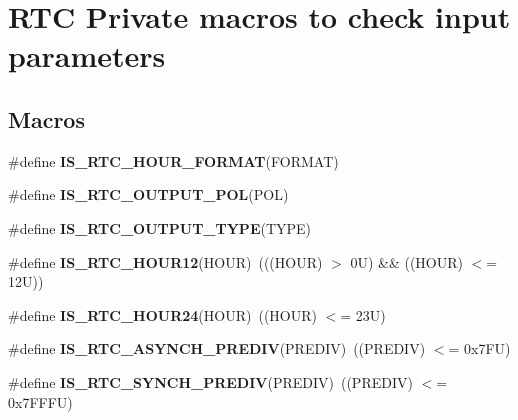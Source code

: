 \hypertarget{group___r_t_c___i_s___r_t_c___definitions}{}\section{R\+TC Private macros to check input parameters}
\label{group___r_t_c___i_s___r_t_c___definitions}
\subsection*{Macros}
\begin{DoxyCompactItemize}
\item 
\#define {\bfseries I\+S\+\_\+\+R\+T\+C\+\_\+\+H\+O\+U\+R\+\_\+\+F\+O\+R\+M\+AT}(F\+O\+R\+M\+AT)
\item 
\#define {\bfseries I\+S\+\_\+\+R\+T\+C\+\_\+\+O\+U\+T\+P\+U\+T\+\_\+\+P\+OL}(P\+OL)
\item 
\#define {\bfseries I\+S\+\_\+\+R\+T\+C\+\_\+\+O\+U\+T\+P\+U\+T\+\_\+\+T\+Y\+PE}(T\+Y\+PE)
\item 
\mbox{\label{group___r_t_c___i_s___r_t_c___definitions_ga6bdfe3bed0a57dfafc2d1de785d48a62}} 
\#define {\bfseries I\+S\+\_\+\+R\+T\+C\+\_\+\+H\+O\+U\+R12}(H\+O\+UR)~(((H\+O\+UR) $>$ 0\+U) \&\& ((\+H\+O\+U\+R) $<$= 12\+U))
\item 
\mbox{\label{group___r_t_c___i_s___r_t_c___definitions_ga4883613bec76074ac62608b89e3f48a8}} 
\#define {\bfseries I\+S\+\_\+\+R\+T\+C\+\_\+\+H\+O\+U\+R24}(H\+O\+UR)~((H\+O\+UR) $<$= 23\+U)
\item 
\mbox{\label{group___r_t_c___i_s___r_t_c___definitions_gac20f6c94ede2d474df8ba4acb7328d93}} 
\#define {\bfseries I\+S\+\_\+\+R\+T\+C\+\_\+\+A\+S\+Y\+N\+C\+H\+\_\+\+P\+R\+E\+D\+IV}(P\+R\+E\+D\+IV)~((P\+R\+E\+D\+IV) $<$= 0x7\+F\+U)
\item 
\mbox{\label{group___r_t_c___i_s___r_t_c___definitions_ga32fccaa6ec65f9fceb3e6e4f31ab11cf}} 
\#define {\bfseries I\+S\+\_\+\+R\+T\+C\+\_\+\+S\+Y\+N\+C\+H\+\_\+\+P\+R\+E\+D\+IV}(P\+R\+E\+D\+IV)~((P\+R\+E\+D\+IV) $<$= 0x7\+F\+F\+F\+U)
\item 
\mbox{\label{group___r_t_c___i_s___r_t_c___definitions_ga8475ceaf2d35d98be0b3401812aef445}} 

\end{DoxyCompactItemize}
